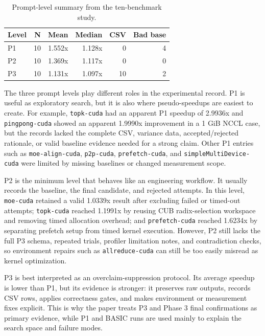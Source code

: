 \documentclass[conference]{IEEEtran}
\begin{document}
\begin{table}[t]
\centering
\caption{Prompt-level summary from the ten-benchmark study.}
\label{tab:promptstats}
\begin{tabular}{lrrrrr}
\hline
Level & N & Mean & Median & CSV & Bad base \\
\hline
P1 & 10 & 1.552x & 1.128x & 0 & 4 \\
P2 & 10 & 1.369x & 1.117x & 0 & 0 \\
P3 & 10 & 1.131x & 1.097x & 10 & 2 \\
\hline
\end{tabular}
\end{table}

The three prompt levels play different roles in the experimental record. P1 is useful as exploratory search, but it is also where pseudo-speedups are easiest to create. For example, \texttt{topk-cuda} had an apparent P1 speedup of 2.9936x and \texttt{pingpong-cuda} showed an apparent 1.9990x improvement in a 1 GiB NCCL case, but the records lacked the complete CSV, variance data, accepted/rejected rationale, or valid baseline evidence needed for a strong claim. Other P1 entries such as \texttt{moe-align-cuda}, \texttt{p2p-cuda}, \texttt{prefetch-cuda}, and \texttt{simpleMultiDevice-cuda} were limited by missing baselines or changed measurement scope.

P2 is the minimum level that behaves like an engineering workflow. It usually records the baseline, the final candidate, and rejected attempts. In this level, \texttt{moe-cuda} retained a valid 1.0339x result after excluding failed or timed-out attempts; \texttt{topk-cuda} reached 1.1991x by reusing CUB radix-selection workspace and removing timed allocation overhead; and \texttt{prefetch-cuda} reached 1.6234x by separating prefetch setup from timed kernel execution. However, P2 still lacks the full P3 schema, repeated trials, profiler limitation notes, and contradiction checks, so environment repairs such as \texttt{allreduce-cuda} can still be too easily misread as kernel optimization.

P3 is best interpreted as an overclaim-suppression protocol. Its average speedup is lower than P1, but its evidence is stronger: it preserves raw outputs, records CSV rows, applies correctness gates, and makes environment or measurement fixes explicit. This is why the paper treats P3 and Phase 3 final confirmations as primary evidence, while P1 and BASIC runs are used mainly to explain the search space and failure modes.
\end{document}
